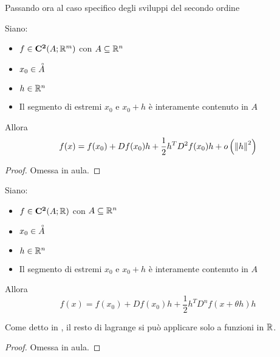 \noindent Passando ora al caso specifico degli sviluppi del secondo ordine
\begin{proposition}
	Siano:
	\begin{itemize}[noitemsep]
		\item $f \in \mathbf{C^{2}}(A;\mathbb{R}^m)$ con $A \subseteq \mathbb{R}^n$
		\item $x_0 \in \accentset{\circ}{A}$
		\item $h \in \mathbb{R}^n$
		\item Il segmento di estremi $x_0$ e $x_0 + h$ è interamente contenuto in $A$
	\end{itemize}
	Allora
	\[f(x) = f(x_0) + Df(x_0)h + \frac{1}{2} h^T D^2f(x_0) h + o\left( \left\|h\right\|^2 \right)\]
	\begin{proof}
		Omessa in aula.
	\end{proof}
\end{proposition}

\begin{proposition}
	Siano:
	\begin{itemize}[noitemsep]
		\item $f \in \mathbf{C^{2}}(A;\mathbb{R})$ con $A \subseteq \mathbb{R}^n$
		\item $x_0 \in \accentset{\circ}{A}$
		\item $h \in \mathbb{R}^n$
		\item Il segmento di estremi $x_0$ e $x_0 + h$ è interamente contenuto in $A$
	\end{itemize}
	Allora
	\[f(x) = f(x_0) + Df(x_0)h + \frac{1}{2} h^T D^n f(x + \theta h) h\] %
	\begin{note}
		Come detto in , il resto di lagrange si può applicare solo a funzioni in $\mathbb{R}$.
	\end{note}
	\begin{proof}
		Omessa in aula.
	\end{proof}
\end{proposition}

